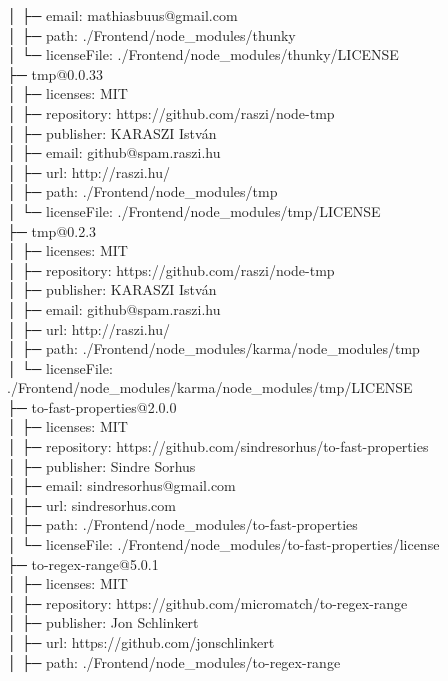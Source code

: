 │  ├─ email: mathiasbuus@gmail.com\\
│  ├─ path: ./Frontend/node\_modules/thunky\\
│  └─ licenseFile: ./Frontend/node\_modules/thunky/LICENSE\\
├─ tmp@0.0.33\\
│  ├─ licenses: MIT\\
│  ├─ repository: https://github.com/raszi/node-tmp\\
│  ├─ publisher: KARASZI István\\
│  ├─ email: github@spam.raszi.hu\\
│  ├─ url: http://raszi.hu/\\
│  ├─ path: ./Frontend/node\_modules/tmp\\
│  └─ licenseFile: ./Frontend/node\_modules/tmp/LICENSE\\
├─ tmp@0.2.3\\
│  ├─ licenses: MIT\\
│  ├─ repository: https://github.com/raszi/node-tmp\\
│  ├─ publisher: KARASZI István\\
│  ├─ email: github@spam.raszi.hu\\
│  ├─ url: http://raszi.hu/\\
│  ├─ path: ./Frontend/node\_modules/karma/node\_modules/tmp\\
│  └─ licenseFile: ./Frontend/node\_modules/karma/node\_modules/tmp/LICENSE\\
├─ to-fast-properties@2.0.0\\
│  ├─ licenses: MIT\\
│  ├─ repository: https://github.com/sindresorhus/to-fast-properties\\
│  ├─ publisher: Sindre Sorhus\\
│  ├─ email: sindresorhus@gmail.com\\
│  ├─ url: sindresorhus.com\\
│  ├─ path: ./Frontend/node\_modules/to-fast-properties\\
│  └─ licenseFile: ./Frontend/node\_modules/to-fast-properties/license\\
├─ to-regex-range@5.0.1\\
│  ├─ licenses: MIT\\
│  ├─ repository: https://github.com/micromatch/to-regex-range\\
│  ├─ publisher: Jon Schlinkert\\
│  ├─ url: https://github.com/jonschlinkert\\
│  ├─ path: ./Frontend/node\_modules/to-regex-range\\
